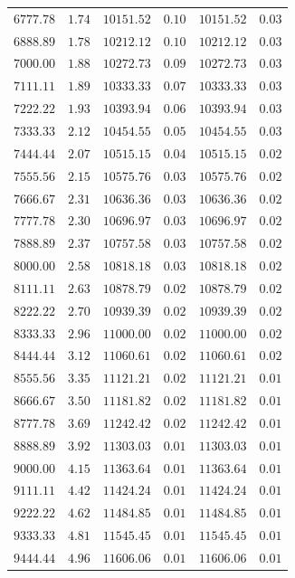 \documentclass[
	12pt,
	]{article}
\theoremstyle{definition}
\theoremstyle{definition}
\theoremstyle{definition}
\theoremstyle{definition}
\theoremstyle{definition}
\theoremstyle{example}
\theoremstyle{note}
\theoremstyle{remark}
\theoremstyle{example}
\begin{document}
\begin{longtable}{cccccc}
				$6777.78$&	$1.74$&	$10151.52$&	$0.10$&	$10151.52$&	$0.03$\\
				$6888.89$&	$1.78$&	$10212.12$&	$0.10$&	$10212.12$&	$0.03$\\
				$7000.00$&	$1.88$&	$10272.73$&	$0.09$&	$10272.73$&	$0.03$\\
				$7111.11$&	$1.89$&	$10333.33$&	$0.07$&	$10333.33$&	$0.03$\\
				$7222.22$&	$1.93$&	$10393.94$&	$0.06$&	$10393.94$&	$0.03$\\
				$7333.33$&	$2.12$&	$10454.55$&	$0.05$&	$10454.55$&	$0.03$\\
				$7444.44$&	$2.07$&	$10515.15$&	$0.04$&	$10515.15$&	$0.02$\\
				$7555.56$&	$2.15$&	$10575.76$&	$0.03$&	$10575.76$&	$0.02$\\
				$7666.67$&	$2.31$&	$10636.36$&	$0.03$&	$10636.36$&	$0.02$\\
				$7777.78$&	$2.30$&	$10696.97$&	$0.03$&	$10696.97$&	$0.02$\\
				$7888.89$&	$2.37$&	$10757.58$&	$0.03$&	$10757.58$&	$0.02$\\
				$8000.00$&	$2.58$&	$10818.18$&	$0.03$&	$10818.18$&	$0.02$\\
				$8111.11$&	$2.63$&	$10878.79$&	$0.02$&	$10878.79$&	$0.02$\\
				$8222.22$&	$2.70$&	$10939.39$&	$0.02$&	$10939.39$&	$0.02$\\
				$8333.33$&	$2.96$&	$11000.00$&	$0.02$&	$11000.00$&	$0.02$\\
				$8444.44$&	$3.12$&	$11060.61$&	$0.02$&	$11060.61$&	$0.02$\\
				$8555.56$&	$3.35$&	$11121.21$&	$0.02$&	$11121.21$&	$0.01$\\
				$8666.67$&	$3.50$&	$11181.82$&	$0.02$&	$11181.82$&	$0.01$\\
				$8777.78$&	$3.69$&	$11242.42$&	$0.02$&	$11242.42$&	$0.01$\\
				$8888.89$&	$3.92$&	$11303.03$&	$0.01$&	$11303.03$&	$0.01$\\
				$9000.00$&	$4.15$&	$11363.64$&	$0.01$&	$11363.64$&	$0.01$\\
				$9111.11$&	$4.42$&	$11424.24$&	$0.01$&	$11424.24$&	$0.01$\\
				$9222.22$&	$4.62$&	$11484.85$&	$0.01$&	$11484.85$&	$0.01$\\
				$9333.33$&	$4.81$&	$11545.45$&	$0.01$&	$11545.45$&	$0.01$\\
				$9444.44$&	$4.96$&	$11606.06$&	$0.01$&	$11606.06$&	$0.01$\\

\end{longtable}
\end{document}
